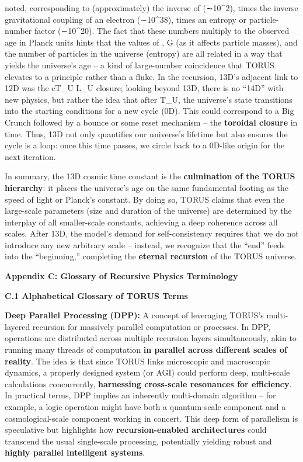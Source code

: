 \documentclass[
]{article}
\begin{document}
{noted\hspace{0pt}, corresponding to (approximately) the inverse of \alpha
(∼10\^{}2), times the inverse gravitational coupling of an electron
(∼10\^{}38), times an entropy or particle-number factor (∼10\^{}20). The
fact that these numbers multiply to the observed age in Planck units
hints that the values of \alpha, G (as it affects particle masses), and the
number of particles in the universe (entropy) are all related in a way
that yields the universe's age -- a kind of large-number coincidence
that TORUS elevates to a principle rather than a fluke\hspace{0pt}. In
the recursion, 13D's adjacent link to 12D was the cT\_U \approx L\_U closure;
looking beyond 13D, there is no ``14D'' with new physics, but rather the
idea that after T\_U, the universe's state transitions into the starting
conditions for a new cycle (0D)\hspace{0pt}. This could correspond to a
Big Crunch followed by a bounce or some reset mechanism -- the
\textbf{toroidal closure} in time. Thus, 13D not only quantifies our
universe's lifetime but also ensures the cycle is a loop: once this time
passes, we circle back to a 0D-like origin for the next iteration.

In summary, the 13D cosmic time constant is the \textbf{culmination of
the TORUS hierarchy}: it places the universe's age on the same
fundamental footing as the speed of light or Planck's constant. By doing
so, TORUS claims that even the large-scale parameters (size and duration
of the universe) are determined by the interplay of all smaller-scale
constants, achieving a deep coherence across all scales. After 13D, the
model's demand for self-consistency requires that we do not introduce
any new arbitrary scale -- instead, we recognize that the ``end'' feeds
into the ``beginning,'' completing the \textbf{eternal recursion} of the
TORUS universe\hspace{0pt}.

\textbf{Appendix C: Glossary of Recursive Physics Terminology}

\textbf{C.1 Alphabetical Glossary of TORUS Terms}

\textbf{Deep Parallel Processing (DPP):} A concept of leveraging TORUS's
multi-layered recursion for massively parallel computation or processes.
In DPP, operations are distributed across multiple recursion layers
simultaneously, akin to running many threads of computation \textbf{in
parallel across different scales of reality}. The idea is that since
TORUS links microscopic and macroscopic dynamics, a properly designed
system (or AGI) could perform deep, multi-scale calculations
concurrently, \textbf{harnessing cross-scale resonances for
efficiency}\hspace{0pt}. In practical terms, DPP implies an inherently
multi-domain algorithm -- for example, a logic operation might have both
a quantum-scale component and a cosmological-scale component working in
concert\hspace{0pt}. This deep form of parallelism is speculative but
highlights how \textbf{recursion-enabled architectures} could transcend
the usual single-scale processing, potentially yielding robust and
\textbf{highly parallel intelligent systems}.

}
\end{document}
